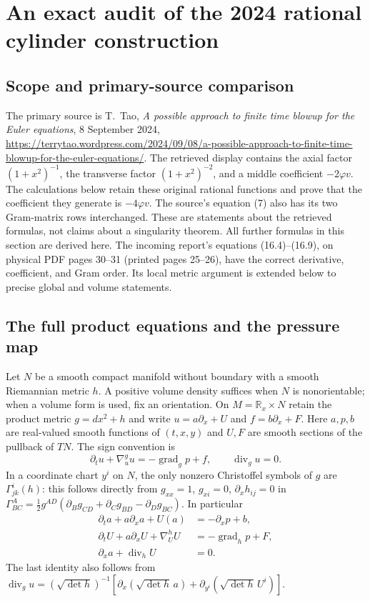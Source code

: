 \section{An exact audit of the 2024 rational cylinder construction}
\label{sec:wb-tao2024}

\subsection{Scope and primary-source comparison}
The primary source is T.~Tao, \emph{A possible approach to finite time
blowup for the Euler equations}, 8 September 2024,
\url{https://terrytao.wordpress.com/2024/09/08/a-possible-approach-to-finite-time-blowup-for-the-euler-equations/}.
The retrieved display contains the axial factor $(1+x^2)^{-1}$,
the transverse factor $(1+x^2)^{-2}$, and a middle coefficient
$-2\varphi v$. The calculations below retain these original rational
functions and prove that the coefficient they generate is $-4\varphi v$.
The source's equation (7) also has its two Gram-matrix rows interchanged.
These are statements about the retrieved formulas, not claims about a
singularity theorem. All further formulas in this section are derived here.
The incoming report's equations (16.4)--(16.9), on physical PDF pages
30--31 (printed pages 25--26), have the correct derivative, coefficient,
and Gram order. Its local metric argument is extended below to precise
global and volume statements.

\subsection{The full product equations and the pressure map}
Let $N$ be a smooth compact manifold without boundary with a smooth
Riemannian metric $h$. A positive volume density suffices when $N$ is
nonorientable; when a volume form is used, fix an orientation.
On $M=\mathbb R_x\times N$ retain the product metric
$g=dx^2+h$ and write $u=a\partial_x+U$ and $f=b\partial_x+F$.
Here $a,p,b$ are real-valued smooth functions of $(t,x,y)$ and $U,F$
are smooth sections of the pullback of $TN$. The sign convention is
\begin{equation}\label{eq:wb-euler-sign}
 \partial_tu+\nabla^g_u u=-\operatorname{grad}_g p+f,
 \qquad \operatorname{div}_g u=0.
\end{equation}
In a coordinate chart $y^i$ on $N$, the only nonzero Christoffel
symbols of $g$ are $\Gamma^i_{jk}(h)$: this follows directly from
$g_{xx}=1$, $g_{xi}=0$, $\partial_xh_{ij}=0$ in
$\Gamma^A_{BC}=\frac12g^{AD}(\partial_Bg_{CD}+\partial_Cg_{BD}
-\partial_Dg_{BC})$. In particular
\begin{align}
 \partial_ta+a\partial_xa+U(a)&=-\partial_xp+b,
 \label{eq:wb-axial}\\
 \partial_tU+a\partial_xU+\nabla^h_U U&=-\operatorname{grad}_h p+F,
 \label{eq:wb-transverse}\\
 \partial_xa+\operatorname{div}_h U&=0.
 \label{eq:wb-div}
\end{align}
The last identity also follows from
$\operatorname{div}_g u=(\sqrt{\det h})^{-1}
[\partial_x(\sqrt{\det h}\,a)+\partial_{y^i}(\sqrt{\det h}\,U^i)]$.

